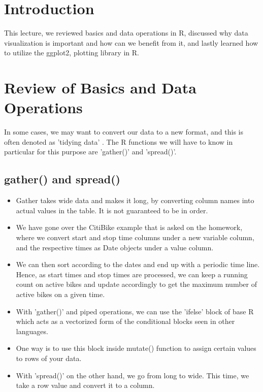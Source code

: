 
\section{Introduction}
This lecture, we reviewed basics and data operations in R, discussed why data visualization is important and how can we benefit from it, and lastly learned how to utilize the ggplot2, plotting library in R.

\section{Review of Basics and Data Operations}

In some cases, we may want to convert our data to a new format, and
this is often denoted as 'tidying data' . The R functions we will have
to know in particular for this purpose are 'gather()' and 'spread()'. 

\subsection{gather() and spread()}
\begin{itemize}
    \item Gather takes wide data and makes it long, by converting
    column names into actual values in the table. It is not guaranteed
    to be in order. 
    \item We have gone over the CitiBike example that is asked on the
    homework, where we convert start and stop time columns under a new
    variable column, and the respective times as Date objects under a
    value column. 
    \item We can then sort according to the dates and end up with a periodic time line.
    Hence, as start times and stop times are processed, we can keep a running count on
    active bikes and update accordingly to get the maximum number of active bikes on a
    given time. 
    \item With 'gather()' and piped operations, we can use the 'ifelse' block of base R
    which acts as a vectorized form of the conditional blocks seen in other languages. 
    \item One way is to use this block inside mutate() function to assign certain values
    to rows of your data.
    \item With 'spread()' on the other hand, we go from long to wide. This time, we take a
    row value and convert it to a column.
\end{itemize}
